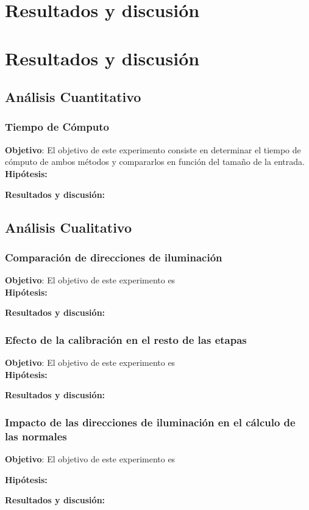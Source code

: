\section{Resultados y discusión}

\section{Resultados y discusión}

\subsection{Análisis Cuantitativo}
\subsubsection{Tiempo de Cómputo}
\textbf{Objetivo}:
El objetivo de este experimento consiste en determinar el tiempo de cómputo de ambos métodos y compararlos en función del tamaño de la entrada.
\\
\textbf{Hipótesis:}

\textbf{Resultados y discusión:}


\subsection{Análisis Cualitativo}
\subsubsection{Comparación de direcciones de iluminación}
\textbf{Objetivo}:
El objetivo de este experimento es 
\\
\textbf{Hipótesis:}

\textbf{Resultados y discusión:}


\subsubsection{Efecto de la calibración en el resto de las etapas}
\textbf{Objetivo}:
El objetivo de este experimento es 
\\
\textbf{Hipótesis:}

\textbf{Resultados y discusión:}


\subsubsection{Impacto de las direcciones de iluminación en el cálculo de las normales}
\textbf{Objetivo}:
El objetivo de este experimento es 

\textbf{Hipótesis:}

\textbf{Resultados y discusión:}